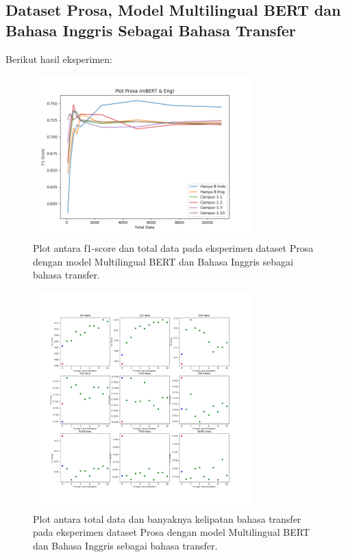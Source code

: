     \subsection{Dataset Prosa, Model Multilingual BERT dan Bahasa Inggris Sebagai Bahasa Transfer}
        Berikut hasil eksperimen: 
        \begin{figure}[ht]
            \centering
            \includegraphics[width=0.75\textwidth]{resources/prosa-mbert-eng-1.png}
            \caption{Plot antara f1-score dan total data pada eksperimen dataset Prosa dengan model Multilingual BERT dan Bahasa Inggris sebagai bahasa transfer.}

            \label{fig:prosa_mbert_eng_1}
        \end{figure}

        \begin{figure}[ht]
            \centering
            \includegraphics[width=0.75\textwidth]{resources/prosa-mbert-eng-2.png}
            \caption{Plot antara total data dan banyaknya kelipatan bahasa transfer pada eksperimen dataset Prosa dengan model Multilingual BERT dan Bahasa Inggris sebagai bahasa transfer.}

            \label{fig:prosa_mbert_eng_2}
        \end{figure}


